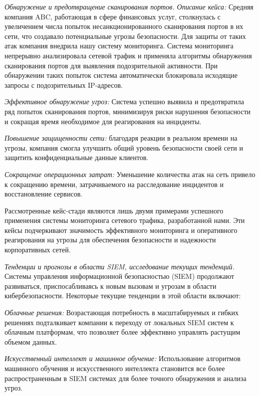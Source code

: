 \begin{multicols}{2}
\emph{Обнаружение и предотвращение сканирования портов. Описание кейса:}
Средняя компания ABC, работающая в сфере финансовых услуг, столкнулась с
увеличением числа попыток несанкционированного сканирования портов в их
сети, что создавало потенциальные угрозы безопасности. Для защиты от
таких атак компания внедрила нашу систему мониторинга. Система
мониторинга непрерывно анализировала сетевой трафик и применяла
алгоритмы обнаружения сканирования портов для выявления подозрительной
активности. При обнаружении таких попыток система автоматически
блокировала исходящие запросы с подозрительных IP-адресов.

\emph{Эффективное обнаружение угроз:} Система успешно выявила и
предотвратила ряд попыток сканирования портов, минимизируя риски
нарушения безопасности и сокращая время необходимое для реагирования на
инциденты.

\emph{Повышение защищенности сети:} благодаря реакции в реальном времени
на угрозы, компания смогла улучшить общий уровень безопасности своей
сети и защитить конфиденциальные данные клиентов.

\emph{Сокращение операционных затрат:} Уменьшение количества атак на
сеть привело к сокращению времени, затрачиваемого на расследование
инцидентов и восстановление сервисов.

Рассмотренные кейс-стади являются лишь двумя примерами успешного
применения системы мониторинга сетевого трафика, разработанной нами. Эти
кейсы подчеркивают значимость эффективного мониторинга и оперативного
реагирования на угрозы для обеспечения безопасности и надежности
корпоративных сетей.

\emph{Тенденции и прогнозы в области SIEM, исследование текущих
тенденций.} Системы управления информационной безопасностью (SIEM)
продолжают развиваться, приспосабливаясь к новым вызовам и угрозам в
области кибербезопасности. Некоторые текущие тенденции в этой области
включают:

\emph{Облачные решения:} Возрастающая потребность в масштабируемых и
гибких решениях подталкивает компании к переходу от локальных SIEM
систем к облачным платформам, что позволяет более эффективно управлять
растущим объемом данных.

\emph{Искусственный интеллект и машинное обучение:} Использование
алгоритмов машинного обучения и искусственного интеллекта становится все
более распространенным в SIEM системах для более точного обнаружения и
анализа угроз.


\end{multicols}
